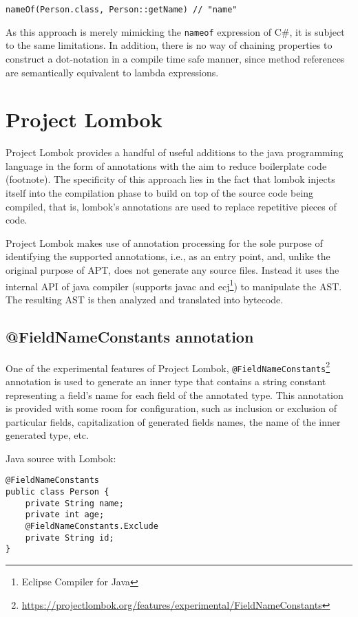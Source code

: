 \begin{verbatim}
nameOf(Person.class, Person::getName) // "name"
\end{verbatim}

As this approach is merely mimicking the \texttt{nameof} expression of C\#, it is subject to the same limitations. In addition, there is no way of chaining properties to construct a dot-notation in a compile time safe manner, since method references are semantically equivalent to lambda expressions.

\section{Project Lombok}
Project Lombok provides a handful of useful additions to the java programming language in the form of annotations with the aim to reduce boilerplate code (footnote). The specificity of this approach lies in the fact that lombok injects itself into the compilation phase to build on top of the source code being compiled, that is, lombok’s annotations are used to replace repetitive pieces of code.

\n

Project Lombok makes use of annotation processing for the sole purpose of identifying the supported annotations, i.e., as an entry point, and, unlike the original purpose of APT, does not generate any source files. Instead it uses the internal API of java compiler (supports javac and ecj\footnote{Eclipse Compiler for Java}) to manipulate the AST. The resulting AST is then analyzed and translated into bytecode.

\subsection{@FieldNameConstants annotation}
One of the experimental features of Project Lombok, \texttt{@FieldNameConstants}\footnote{\url{https://projectlombok.org/features/experimental/FieldNameConstants}} annotation is used to generate an inner type that contains a string constant representing a field’s name for each field of the annotated type. This annotation is provided with some room for configuration, such as inclusion or exclusion of particular fields, capitalization of generated fields names, the name of the inner generated type, etc.

Java source with Lombok:
\begin{verbatim}
@FieldNameConstants
public class Person {
    private String name;
    private int age;
    @FieldNameConstants.Exclude
    private String id;
}
\end{verbatim}

